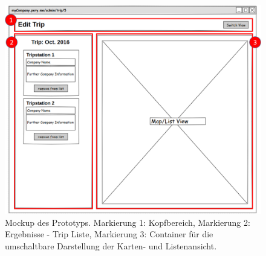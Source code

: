 \documentclass[Bachelorarbeit.tex]{subfiles}
\begin{document}
\begin{figure}[h]
\centering
\includegraphics[width=0.8\linewidth]{img/Mockups/prototypMockup}
\caption[Mockup des Prototyps]{Mockup des Prototyps. Markierung 1: Kopfbereich, Markierung 2: Ergebnisse - Trip Liste, Markierung 3: Container für die umschaltbare Darstellung der Karten- und Listenansicht.}
\label{fig:prototypMockup}
\end{figure}
\end{document}
